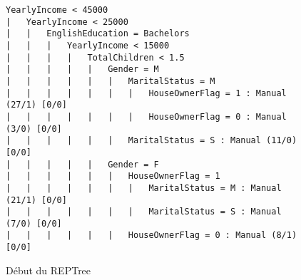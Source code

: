 \begin{figure}[H]
\centering
\begin{lstlisting}
YearlyIncome < 45000
|   YearlyIncome < 25000
|   |   EnglishEducation = Bachelors
|   |   |   YearlyIncome < 15000
|   |   |   |   TotalChildren < 1.5
|   |   |   |   |   Gender = M
|   |   |   |   |   |   MaritalStatus = M
|   |   |   |   |   |   |   HouseOwnerFlag = 1 : Manual (27/1) [0/0]
|   |   |   |   |   |   |   HouseOwnerFlag = 0 : Manual (3/0) [0/0]
|   |   |   |   |   |   MaritalStatus = S : Manual (11/0) [0/0]
|   |   |   |   |   Gender = F
|   |   |   |   |   |   HouseOwnerFlag = 1
|   |   |   |   |   |   |   MaritalStatus = M : Manual (21/1) [0/0]
|   |   |   |   |   |   |   MaritalStatus = S : Manual (7/0) [0/0]
|   |   |   |   |   |   HouseOwnerFlag = 0 : Manual (8/1) [0/0]
\end{lstlisting}
\caption{Début du REPTree}
\label{lst:reptree_sample}
\end{figure}
